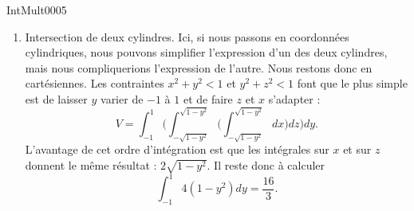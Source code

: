 \begin{corrige}{IntMult0005}
\begin{enumerate}
\item
Intersection de deux cylindres. Ici, si nous passons en coordonnées cylindriques, nous pouvons simplifier l'expression d'un des deux cylindres, mais nous compliquerions l'expression de l'autre. Nous restons donc en cartésiennes. Les contraintes $x^2+y^2<1$ et $y^2+z^2<1$ font que le plus simple est de laisser $y$ varier de $-1$ à $1$ et de faire $z$ et $x$ s'adapter :
\begin{equation}
	V=\int_{-1}^1\Big( \int_{-\sqrt{1-y^2}}^{\sqrt{1-y^2}}\big( \int_{-\sqrt{1-y^2}}^{\sqrt{1-y^2}}dx\big)dz\Big)dy.
\end{equation}
L'avantage de cet ordre d'intégration est que les intégrales sur $x$ et sur $z$ donnent le même résultat : $2\sqrt{1-y^2}$. Il reste donc à calculer
\begin{equation}
	\int_{-1}^1 4(1-y^2)dy=\frac{ 16 }{ 3 }.
\end{equation}

\end{enumerate}

\end{corrige}
